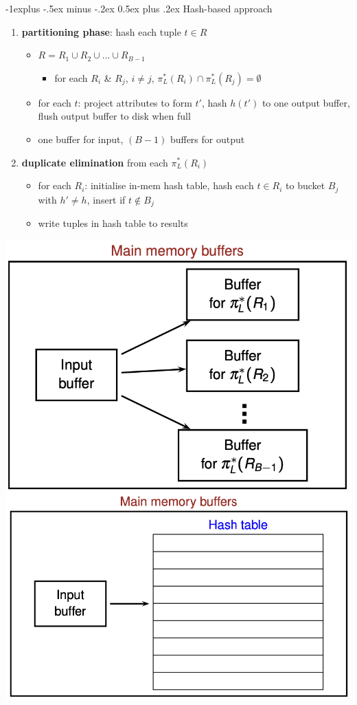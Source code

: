 \documentclass[10pt, landscape]{article}
\makeatletter
\renewcommand{\subsection}{\@startsection{subsection}{2}{0mm}%
  {-1explus -.5ex minus -.2ex}%
  {0.5ex plus .2ex}%
{\normalfont\normalsize\bfseries}}
\makeatother
\begin{document}
\begin{multicols*}{4}
  \subsection{Hash-based approach}

  \begin{enumerate}
    \item \textbf{partitioning phase}: hash each tuple $t \in R$ 
      \begin{itemize}
        \item $R = R_1 \cup R_2 \cup \dots \cup R_{B-1}$
          \begin{itemize}
            \item for each $R_i$ \& $R_j$, $i \neq j$, $\pi_L^*(R_i) \cap \pi_L^*(R_j) = \emptyset$
          \end{itemize}
        \item for each $t$: project attributes to form $t'$, hash $h(t')$ to one output buffer, flush output buffer to disk when full
        \item one buffer for input, $(B-1)$ buffers for output
      \end{itemize}
    \item \textbf{duplicate elimination} from each $\pi^*_L(R_i)$
      \begin{itemize}
        \item for each $R_i$: initialise in-mem hash table, hash each $t \in R_i$ to bucket $B_j$ with $h' \neq h$, insert if $t \not\in B_j$
        \item write tuples in hash table to results
      \end{itemize}
  \end{enumerate}
  \includegraphics[width=0.4\linewidth]{cs3223-projection-hash-1.png} 
  \includegraphics[width=0.5\linewidth]{cs3223-projection-hash-2.png} 


\end{multicols*}
\end{document}
